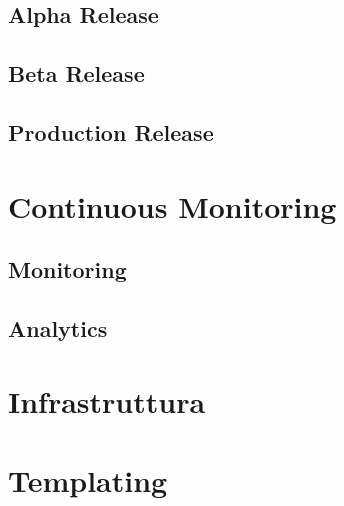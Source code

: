 \subsection{Alpha Release}

\subsection{Beta Release}

\subsection{Production Release}

\section{Continuous Monitoring}
\subsection{Monitoring}
\subsection{Analytics}

\section{Infrastruttura}

\section{Templating}
